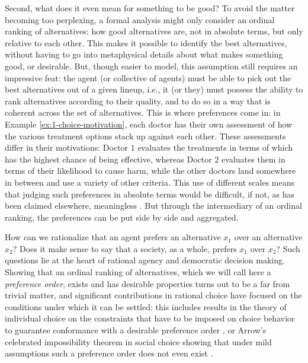 Second, what does it even mean for something to be good?
To avoid the matter becoming too perplexing,
a formal analysis might only consider an ordinal ranking 
of alternatives: how good alternatives are, not in absolute terms,
but only relative to each other.
This makes it possible to identify the best alternatives,
without having to go into metaphysical details about 
what makes something good, or desirable. 
But, though easier to model, this assumption still 
requires an impressive feat: 
the agent (or collective of agents) must 
be able to pick out the best alternatives 
out of a given lineup,
i.e., it (or they) must possess the ability 
to rank alternatives according to their quality,
and to do so in a way that is coherent across 
the set of alternatives.
This is where preferences come in:
in Example \ref{ex:1-choice-motivation},
each doctor has their own assessment of how the
various treatment options stack up against each other.
These assessments differ in their motivations: 
Doctor $1$ evaluates the treatments in terms 
of which has the highest chance of being effective,
whereas Doctor $2$ evaluates them in terms of
their likelihood to cause harm,
while the other doctors land somewhere in between
and use a variety of other criteria.
This use of different scales means that judging such 
preferences in absolute terms would be difficult,
if not, as has been claimed elsewhere, meaningless \cite{Arrow51}.
But through the intermediary of an ordinal ranking, 
the preferences can be put side by side and aggregated.

How can we rationalize that an agent prefers 
an alternative $x_1$ over an alternative $x_2$?
Does it make sense to say that a society, 
as a whole, prefers $x_1$ over $x_2$?
Such questions lie at the heart of rational agency 
and democratic decision making.
Showing that an ordinal ranking of alternatives, 
which we will call here a \emph{preference order},
exists and has desirable properties
turns out to be a far from trivial matter,
and significant contributions in rational choice have focused on 
the conditions under which it can be settled:
this includes results in the theory of individual choice on 
the constraints that have to be imposed on choice behavior
to guarantee conformance with a desirable preference order \cite{Sen69,Sen70},
or Arrow's celebrated impossibility theorem in social choice
showing that under mild assumptions such a preference order does not even exist 
\cite{Arrow51}.

